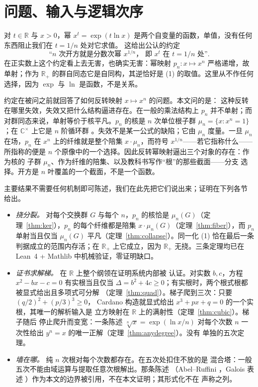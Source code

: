 \documentclass[submission,noinfoline]{jsfds}
\begin{document}
\section{问题、输入与逻辑次序}\label{sec:intro}

对 $t\in\mathbb R$ 与 $x>0$，幂 $x^t=\exp(t\ln x)$ \citep{Euler1748}
是两个自变量的函数，单值，没有任何东西阻止我们在 $t=1/n$ 处对它求值。
这给出公认的约定
\begin{equation}
  \text{``$n$ 次开方就是分数次幂 $x^{1/n}$，
  即 $x^t$ 在 $t=1/n$ 处''}.
\end{equation}
在正实数上这个约定看上去无害，也确实无害：幂映射 $p_n\colon x\mapsto x^n$
严格递增，故单射；作为 $\mathbb R_+$ 的群自同态它是自同构，其逆恰好是
(1) 的取值。这里从不作任何选择，因为 $\exp$ 与 $\ln$ 是函数，不是关系。

约定在被问之前就回答了如何反转映射 $x\mapsto x^n$ 的问题。本文问的是：
这种反转在哪里失效，失效又把什么结构逼进存在。在一般的乘法结构上
$p_n$ 并不单射；而对群同态来说，单射等价于核平凡。$p_n$ 的核是
$n$ 次单位根子群 $\mu_n=\{x:x^n=1\}$；在 $\mathbb C^\times$ 上它是
$n$ 阶循环群 \citep{Gauss1801}。失效不是某一公式的缺陷；它由 $\mu_n$
度量。一旦 $\mu_n$ 在场，$p_n$ 在 $x^n$ 上的纤维就是整个陪集
$x\cdot\mu_n$，而符号 $x^{1/n}$——若它指称什么——所指称的便是
$n$ 个原像中的一个选择。因此反转幂映射逼出三个对象的存在：作为核的
子群 $\mu_n$、作为纤维的陪集、以及教科书写作``根''的那些截面——分支
选择。开方是 $n$ 叶覆盖的一个截面，不是一个函数。

主要结果不需要任何机制即可陈述，我们在此先把它们说出来；证明在下列各节
给出。

\begin{itemize}
\item \emph{挠分裂。} 对每个交换群 $G$ 与每个 $n$，$p_n$ 的核恰是
$\mu_n(G)$（定理~\ref{thm:ker}），$p_n$ 的每个纤维都是陪集
$x\cdot\mu_n(G)$（定理~\ref{thm:fiber}），而 $p_n$ 单射当且仅当
$\mu_n(G)$ 平凡（定理~\ref{thm:collapse}）。同一化 (1) 恰在最后一条
判据成立的范围内存活；在 $\mathbb R_+$ 上它成立，因为 $\mathbb R_+$
无挠。三条定理均已在 Lean~4 + Mathlib 中机械验证，零证明缺口。
\item \emph{证书求解梯。} 在 $\mathbb R$ 上整个纲领在证明系统内部被
认证。对实数 $b,c$，方程 $x^2-bx-c=0$ 有实根当且仅当
$\Delta=b^2+4c\ge0$；有实根时，两个根式根都被显式给出且多项式可分解
（定理~\ref{thm:quad}）。梯子爬到三次：只要 $(q/2)^2+(p/3)^3\ge0$，
Cardano 构造就显式给出 $x^3+px+q=0$ 的一个实根，其唯一的解析输入是
立方映射在 $\mathbb R$ 上的满射性（定理~\ref{thm:cubic}）。梯子随后
停止爬升而变宽：一条陈述 $\sqrt[n]{x}=\exp(\ln x/n)$ 对每个次数
$n$ 一次性给出 $y^n=x$ 的唯一正解（定理~\ref{thm:anydegree}）。没有
单独的五次定理。
\item \emph{墙在哪。} 纯 $n$ 次根对每个次数都存在。在五次处扣住不放的是
混合塔：一般五次不能由域运算与提取任意次根解出。那条陈述
（Abel--Ruffini \citep{Abel1824}，Galois 表述
\citep{Galois1846}）作为本文的边界被引用，不在本文证明；其形式化不在
声称之列。
\end{itemize}
\end{document}
